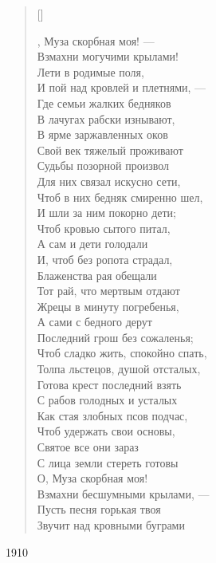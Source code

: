 

\begin{verse}[\versewidth]
\begin{patverse*}
, Муза скорбная моя! ---\\
Взмахни могучими крылами!\\
Лети в родимые поля,\\
И пой над кровлей и плетнями, ---\\
Где семьи жалких бедняков\\
В лачугах рабски изнывают,\\
В ярме заржавленных оков\\
Свой век тяжелый проживают\ldotse\\
Судьбы позорной произвол\\
Для них связал искусно сети,\\
Чтоб в них бедняк смиренно шел,\\
И шли за ним покорно дети;\\
Чтоб кровью сытого питал,\\
А сам и дети голодали\ldotst\\
И, чтоб без ропота страдал,\\
Блаженства рая обещали\ldotst\\
Тот рай, что мертвым отдают\\
Жрецы в минуту погребенья,\\
А сами с бедного дерут\\
Последний грош без сожаленья;\\
Чтоб сладко жить, спокойно спать,\\
Толпа льстецов, душой отсталых,\\
Готова крест последний взять\\
С рабов голодных и усталых\ldotst\\
Как стая злобных псов подчас,\\
Чтоб удержать свои основы,\\
Святое все они зараз\\
С лица земли стереть готовы\ldotst\\
О, Муза скорбная моя!\\
Взмахни бесшумными крылами, ---\\
Пусть песня горькая твоя\\
Звучит над кровными буграми\ldotse
\end{patverse*}
\end{verse}
1910




